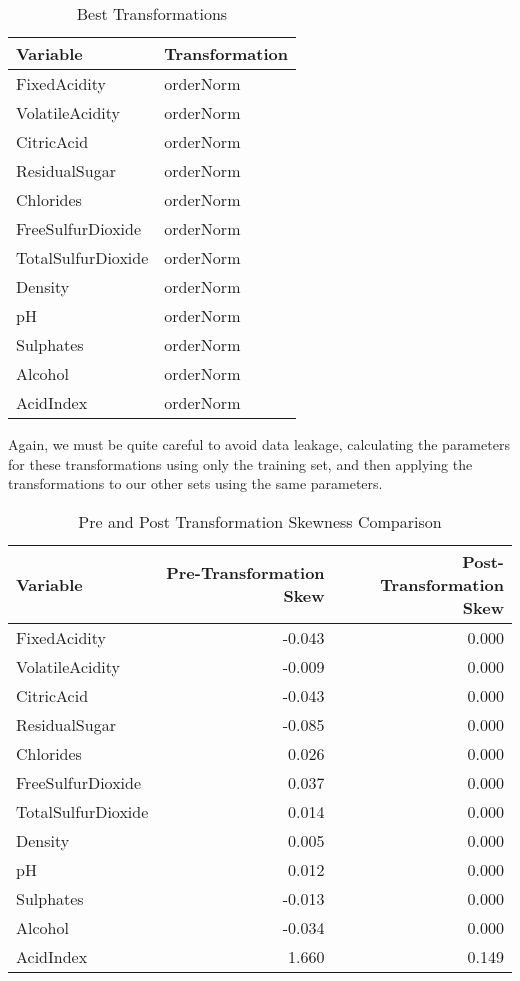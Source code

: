 \documentclass[
]{article}
\begin{document}
\begin{table}[H]
\centering\centering
\caption{\label{tab:bestNormalize usage}Best Transformations}
\centering
\begin{tabular}[t]{l|l}
\hline
Variable & Transformation\\
\hline
FixedAcidity & orderNorm\\
\hline
VolatileAcidity & orderNorm\\
\hline
CitricAcid & orderNorm\\
\hline
ResidualSugar & orderNorm\\
\hline
Chlorides & orderNorm\\
\hline
FreeSulfurDioxide & orderNorm\\
\hline
TotalSulfurDioxide & orderNorm\\
\hline
Density & orderNorm\\
\hline
pH & orderNorm\\
\hline
Sulphates & orderNorm\\
\hline
Alcohol & orderNorm\\
\hline
AcidIndex & orderNorm\\
\hline
\end{tabular}
\end{table}

Again, we must be quite careful to avoid data leakage, calculating the
parameters for these transformations using only the training set, and
then applying the transformations to our other sets using the same
parameters.

\begin{table}[H]
\centering\centering
\caption{\label{tab:skew before and after}Pre and Post Transformation Skewness Comparison}
\centering
\begin{tabular}[t]{l|r|r}
\hline
Variable & Pre-Transformation Skew & Post-Transformation Skew\\
\hline
FixedAcidity & -0.043 & 0.000\\
\hline
VolatileAcidity & -0.009 & 0.000\\
\hline
CitricAcid & -0.043 & 0.000\\
\hline
ResidualSugar & -0.085 & 0.000\\
\hline
Chlorides & 0.026 & 0.000\\
\hline
FreeSulfurDioxide & 0.037 & 0.000\\
\hline
TotalSulfurDioxide & 0.014 & 0.000\\
\hline
Density & 0.005 & 0.000\\
\hline
pH & 0.012 & 0.000\\
\hline
Sulphates & -0.013 & 0.000\\
\hline
Alcohol & -0.034 & 0.000\\
\hline
AcidIndex & 1.660 & 0.149\\
\hline
\end{tabular}
\end{table}
\end{document}
